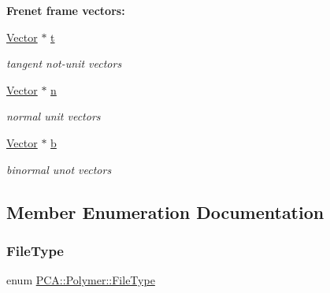 \begin{Indent}{\bf Frenet frame vectors\+:}\par
\begin{DoxyCompactItemize}
\item 
\hyperlink{class_p_c_a_1_1_vector}{Vector} $\ast$ \hyperlink{class_p_c_a_1_1_polymer_a0fd79e19a8c09a9e4c72903924151b5e}{t}
\begin{DoxyCompactList}\small\item\em tangent not-\/unit vectors \end{DoxyCompactList}\item 
\hyperlink{class_p_c_a_1_1_vector}{Vector} $\ast$ \hyperlink{class_p_c_a_1_1_polymer_a7c71d8f5516ae0b0ead3929296135d1b}{n}
\begin{DoxyCompactList}\small\item\em normal unit vectors \end{DoxyCompactList}\item 
\hyperlink{class_p_c_a_1_1_vector}{Vector} $\ast$ \hyperlink{class_p_c_a_1_1_polymer_ad93199b0187ab557476153b204b921c7}{b}
\begin{DoxyCompactList}\small\item\em binormal unot vectors \end{DoxyCompactList}\end{DoxyCompactItemize}
\end{Indent}


\subsection{Member Enumeration Documentation}
\hypertarget{class_p_c_a_1_1_polymer_a1df36a764fbf04ccd5cbe8edb49d43bd}{}\label{class_p_c_a_1_1_polymer_a1df36a764fbf04ccd5cbe8edb49d43bd} 
\subsubsection{\texorpdfstring{File\+Type}{FileType}}
{\footnotesize\ttfamily enum \hyperlink{class_p_c_a_1_1_polymer_a1df36a764fbf04ccd5cbe8edb49d43bd}{P\+C\+A\+::\+Polymer\+::\+File\+Type}\hspace{0.3cm}{\ttfamily [strong]}}

